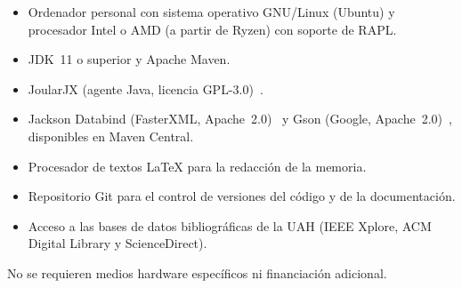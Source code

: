 \documentclass[11pt,a4paper,oneside]{article}
\begin{document}
\begin{itemize}
\item Ordenador personal con sistema operativo GNU/Linux (Ubuntu) y
  procesador Intel o AMD (a partir de Ryzen) con soporte de RAPL.

\item JDK~11 o superior y Apache Maven.

\item JoularJX (agente Java, licencia GPL-3.0)~\cite{joularjxrepo}.

\item Jackson Databind (FasterXML, Apache~2.0)~\cite{jackson} y Gson
  (Google, Apache~2.0)~\cite{gson}, disponibles en Maven Central.

\item Procesador de textos \LaTeX{} para la redacción de la memoria.

\item Repositorio Git para el control de versiones del código y de la
  documentación.

\item Acceso a las bases de datos bibliográficas de la UAH (IEEE Xplore,
  ACM Digital Library y ScienceDirect).
\end{itemize}

No se requieren medios hardware específicos ni financiación adicional.




% 


\end{document}

